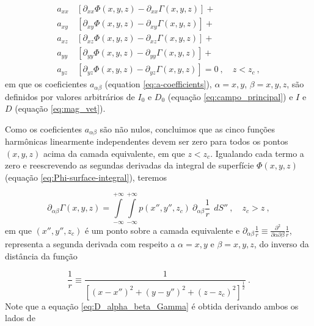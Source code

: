 \begin{equation}
\begin{split}
a_{xx} \, &\left[\partial_{xx} \Phi(x, y, z) - \partial_{xx} \Gamma(x, y, z) \right] + \\
a_{xy} \, &\left[\partial_{xy} \Phi(x, y, z) - \partial_{xy} \Gamma(x, y, z) \right] + \\
a_{xz} \, &\left[\partial_{xz} \Phi(x, y, z) - \partial_{xz} \Gamma(x, y, z) \right] + \\
a_{yy} \, &\left[\partial_{yy} \Phi(x, y, z) - \partial_{yy} \Gamma(x, y, z) \right] + \\
a_{yz} \, &\left[\partial_{yz} \Phi(x, y, z) - \partial_{yz} \Gamma(x, y, z) \right] = 0
\: , \quad z < z_{c} \: ,
\end{split}
\label{eq:tfanomaly-alternative-equality}
\end{equation}
em que os coeficientes $a_{\alpha\beta}$ (equation \ref{eq:a-coefficients}), $\alpha = x, y$, $\beta = x, y, z$, são definidos por valores arbitrários de $I_{0}$ e $D_{0}$ (equação \ref{eq:campo_principal}) e $I$ e $D$ (equação \ref{eq:mag_vet}).

Como os coeficientes $a_{\alpha\beta}$ são não nulos, concluimos que as cinco funções harmônicas linearmente independentes devem ser zero para todos os pontos $(x,y,z)$ acima da camada equivalente, em que $z < z_{c}$. Igualando cada termo a zero e reescrevendo as segundas derivadas da integral de superfície $\Phi(x, y, z)$ (equação \ref{eq:Phi-surface-integral}), teremos 

\begin{equation}
	\partial_{\alpha\beta} \Gamma(x, y, z) = 
	\int\limits_{-\infty}^{+\infty}\int\limits_{-\infty}^{+\infty}
	p(x'', y'', z_{c}) \: \partial_{\alpha\beta} \frac{1}{r} \:\: dS'' \: ,
	\quad z_{c} > z \: ,
	\label{eq:D_alpha_beta_Gamma}
\end{equation}
em que $(x'', y'', z_{c})$ é um ponto sobre a camada equivalente e $\partial_{\alpha\beta} \frac{1}{r} \equiv \frac{\partial^{2}}{\partial \alpha \partial \beta} \frac{1}{r}$, representa a segunda derivada com respeito a  $\alpha = x, y$ e $\beta = x, y, z$, do inverso da distância da função 

\begin{equation}
   \frac{1}{r} \equiv 
	\frac{1}{\left[ (x-x'')^2 + (y-y'')^2 + (z-z_{c})^2 \right]^{\frac{1}{2}}} \: .
	\label{eq:inverse-distance}
\end{equation}
Note que a equação \ref{eq:D_alpha_beta_Gamma} é obtida derivando ambos os lados de 

